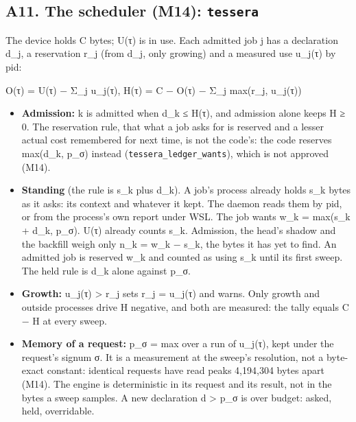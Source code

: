 \subsection{\texorpdfstring{A11. The scheduler (M14): \texttt{tessera}}{A11. The scheduler (M14): tessera}}

The device holds C bytes; U(τ) is in use. Each admitted job j has a declaration d\_\allowbreak{}j, a reservation r\_\allowbreak{}j (from d\_\allowbreak{}j, only growing) and a measured use u\_\allowbreak{}j(τ) by pid:

O(τ) = U(τ) − Σ\_\allowbreak{}j u\_\allowbreak{}j(τ),  H(τ) = C − O(τ) − Σ\_\allowbreak{}j max(r\_\allowbreak{}j, u\_\allowbreak{}j(τ))

\begin{itemize}
\item \textbf{Admission:} k is admitted when d\_\allowbreak{}k ≤ H(τ), and admission alone keeps H ≥ 0. The reservation rule, that what a job asks for is reserved and a lesser actual cost remembered for next time, is not the code's: the code reserves max(d\_\allowbreak{}k, p\_\allowbreak{}σ) instead (\texttt{tessera\_\allowbreak{}ledger\_\allowbreak{}wants}), which is not approved (M14).
\item \textbf{Standing} (the rule is s\_\allowbreak{}k plus d\_\allowbreak{}k). A job's process already holds s\_\allowbreak{}k bytes as it asks: its context and whatever it kept. The daemon reads them by pid, or from the process's own report under WSL. The job wants w\_\allowbreak{}k = max(s\_\allowbreak{}k + d\_\allowbreak{}k, p\_\allowbreak{}σ). U(τ) already counts s\_\allowbreak{}k. Admission, the head's shadow and the backfill weigh only n\_\allowbreak{}k = w\_\allowbreak{}k − s\_\allowbreak{}k, the bytes it has yet to find. An admitted job is reserved w\_\allowbreak{}k and counted as using s\_\allowbreak{}k until its first sweep. The held rule is d\_\allowbreak{}k alone against p\_\allowbreak{}σ.
\item \textbf{Growth:} u\_\allowbreak{}j(τ) > r\_\allowbreak{}j sets r\_\allowbreak{}j = u\_\allowbreak{}j(τ) and warns. Only growth and outside processes drive H negative, and both are measured: the tally equals C − H at every sweep.
\item \textbf{Memory of a request:} p\_\allowbreak{}σ = max over a run of u\_\allowbreak{}j(τ), kept under the request's signum σ. It is a measurement at the sweep's resolution, not a byte-exact constant: identical requests have read peaks 4,194,304 bytes apart (M14). The engine is deterministic in its request and its result, not in the bytes a sweep samples. A new declaration d > p\_\allowbreak{}σ is over budget: asked, held, overridable.

\end{itemize}
